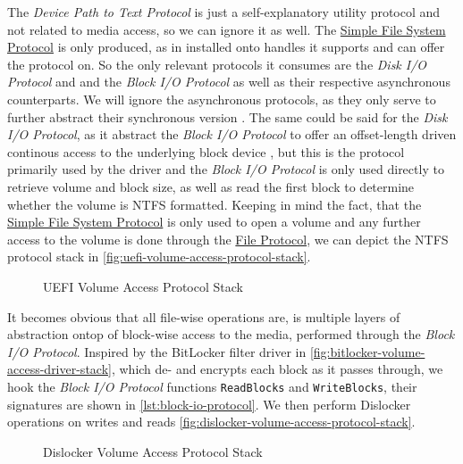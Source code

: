 The \emph{Device Path to Text Protocol} is just a self-explanatory utility protocol and not related to media access, so we can ignore it as well.
The \hyperref[lst:simple-filesytem-protocol]{Simple File System Protocol} is only produced, as in installed onto handles it supports and can offer the protocol on.
So the only relevant protocols it consumes are the \emph{Disk \ac{I/O} Protocol} and and the \emph{Block \ac{I/O} Protocol} as well as their respective asynchronous counterparts.
We will ignore the asynchronous protocols, as they only serve to further abstract their synchronous version \cite[13.8 and 13.10]{uefi-spec}.
The same could be said for the \emph{Disk \ac{I/O} Protocol}, as it abstract the \emph{Block \ac{I/O} Protocol} to offer an offset-length driven continous access to the underlying block device \cite[13.7]{uefi-spec}, but this is the protocol primarily used by the driver and the \emph{Block \ac{I/O} Protocol} is only used directly to retrieve volume and block size, as well as read the first block to determine whether the volume is \ac{NTFS} formatted.
Keeping in mind the fact, that the \hyperref[lst:simple-filesytem-protocol]{Simple File System Protocol} is only used to open a volume and any further access to the volume is done through the \hyperref[lst:file-protocol]{File Protocol}, we can depict the \ac{NTFS} protocol stack in \autoref{fig:uefi-volume-access-protocol-stack}.

\begin{figure}[htb]%
    \centering
    
    \caption{\ac{UEFI} Volume Access Protocol Stack}%
    \label{fig:uefi-volume-access-protocol-stack}%
\end{figure}

It becomes obvious that all file-wise operations are, is multiple layers of abstraction ontop of block-wise access to the media, performed through the \emph{Block \ac{I/O} Protocol}.
Inspired by the BitLocker filter driver in \autoref{fig:bitlocker-volume-access-driver-stack}, which de- and encrypts each block as it passes through, we hook the \emph{Block \ac{I/O} Protocol} functions \lstinline{ReadBlocks} and \lstinline{WriteBlocks}, their signatures are shown in \autoref{lst:block-io-protocol}.
We then perform Dislocker operations on writes and reads \autoref{fig:dislocker-volume-access-protocol-stack}.


\begin{figure}[htb]%
    \centering
    
    \caption{Dislocker Volume Access Protocol Stack}%
    \label{fig:dislocker-volume-access-protocol-stack}%
\end{figure}

